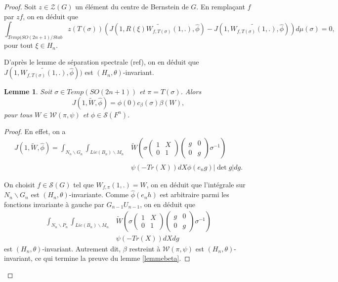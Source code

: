 \documentclass{amsart}
\newtheorem{lemme}{Lemme}[section]
\begin{document}
\begin{proof}
Soit $z \in \mathcal{Z}(G)$ un élément du centre de Bernstein de $G$. En remplaçant $f$ par $zf$, on en déduit que
\begin{equation}
\int_{Temp(SO(2n+1)/Stab} z(T(\sigma))(J(1, \widetilde{R(\xi)W_{f, T(\sigma)}(1,.)}, \widehat{\phi})-J(1, \widetilde{W_{f, T(\sigma)}(1,.)}, \widehat{\phi})) d\mu(\sigma) = 0,
\end{equation}
pour tout $\xi \in H_n$.

D'après le lemme de séparation spectrale (ref), on en déduit que
$J(1, \widetilde{W_{f, T(\sigma)}(1,.)}, \widehat{\phi}))$ est $(H_n, \theta)$-invariant.

\begin{lemme}
\label{zetabeta}
Soit $\sigma \in Temp(SO(2n+1))$ et $\pi = T(\sigma)$. Alors
\begin{equation}
J(1, \widetilde{W}, \widehat{\phi}) = \phi(0)c_\beta(\sigma)\beta(W),
\end{equation}
pour tous $W \in \mathcal{W}(\pi, \psi)$ et $\phi \in \mathcal{S}(F^n)$.
\end{lemme}

\begin{proof}
En effet, on a
\begin{equation}
\begin{split}
J(1, \widetilde{W}, \widehat{\phi}) = \int_{N_n \backslash G_n} \int_{Lie(B_n) \backslash M_n} &\widetilde{W}\left(\sigma\begin{pmatrix}
1 & X \\
0 & 1
\end{pmatrix} \begin{pmatrix}
g & 0 \\
0 & g
\end{pmatrix} \sigma^{-1}\right) \\
& \psi(-Tr(X)) dX \widehat{\phi}(e_ng) |\det g| dg.
\end{split}
\end{equation}

On choisit $f \in \mathcal{S}(G)$ tel que $W_{f,\pi}(1,.) = W$, on en déduit que l'intégrale sur $N_n \backslash G_n$ est $(H_n, \theta)$-invariante. Comme $\widehat{\phi}(e_nh)$ est arbitraire parmi les fonctions invariante à gauche par $G_{n-1}U_{n-1}$, on en déduit que
\begin{equation}
\begin{split}
\int_{N_n \backslash P_n} \int_{Lie(B_n) \backslash M_n} &\widetilde{W}\left(\sigma\begin{pmatrix}
1 & X \\
0 & 1
\end{pmatrix} \begin{pmatrix}
g & 0 \\
0 & g
\end{pmatrix} \sigma^{-1}\right) \\
& \psi(-Tr(X)) dX dg
\end{split}
\end{equation}
est $(H_n, \theta)$-invariant. Autrement dit, $\beta$ restreint à $\mathcal{W}(\pi, \psi)$ est $(H_n, \theta)$-invariant, ce qui termine la preuve du lemme \ref{lemmebeta}.


\end{proof}
\end{proof}
\end{document}

